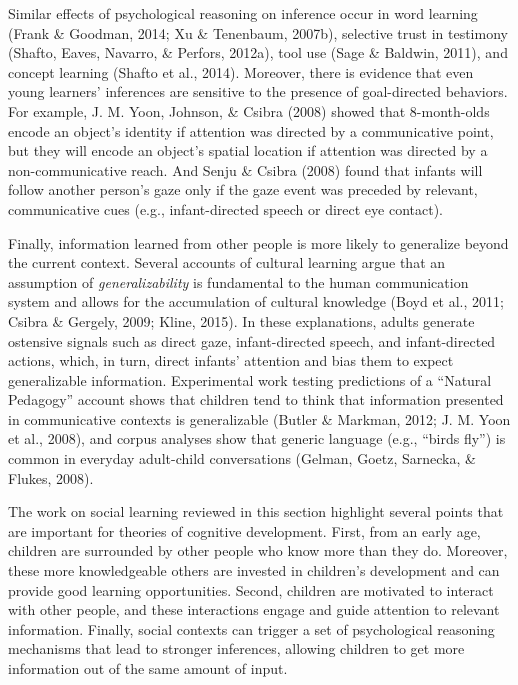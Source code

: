 \documentclass[oneside]{report}
\begin{document}
Similar effects of psychological reasoning on inference occur in word
learning (Frank \& Goodman, 2014; Xu \& Tenenbaum, 2007b), selective
trust in testimony (Shafto, Eaves, Navarro, \& Perfors, 2012a), tool use
(Sage \& Baldwin, 2011), and concept learning (Shafto et al., 2014).
Moreover, there is evidence that even young learners' inferences are
sensitive to the presence of goal-directed behaviors. For example, J. M.
Yoon, Johnson, \& Csibra (2008) showed that 8-month-olds encode an
object's identity if attention was directed by a communicative point,
but they will encode an object's spatial location if attention was
directed by a non-communicative reach. And Senju \& Csibra (2008) found
that infants will follow another person's gaze only if the gaze event
was preceded by relevant, communicative cues (e.g., infant-directed
speech or direct eye contact).

Finally, information learned from other people is more likely to
generalize beyond the current context. Several accounts of cultural
learning argue that an assumption of \emph{generalizability} is
fundamental to the human communication system and allows for the
accumulation of cultural knowledge (Boyd et al., 2011; Csibra \&
Gergely, 2009; Kline, 2015). In these explanations, adults generate
ostensive signals such as direct gaze, infant-directed speech, and
infant-directed actions, which, in turn, direct infants' attention and
bias them to expect generalizable information. Experimental work testing
predictions of a ``Natural Pedagogy'' account shows that children tend
to think that information presented in communicative contexts is
generalizable (Butler \& Markman, 2012; J. M. Yoon et al., 2008), and
corpus analyses show that generic language (e.g., ``birds fly'') is
common in everyday adult-child conversations (Gelman, Goetz, Sarnecka,
\& Flukes, 2008).

The work on social learning reviewed in this section highlight several
points that are important for theories of cognitive development. First,
from an early age, children are surrounded by other people who know more
than they do. Moreover, these more knowledgeable others are invested in
children's development and can provide good learning opportunities.
Second, children are motivated to interact with other people, and these
interactions engage and guide attention to relevant information.
Finally, social contexts can trigger a set of psychological reasoning
mechanisms that lead to stronger inferences, allowing children to get
more information out of the same amount of input.
\end{document}
